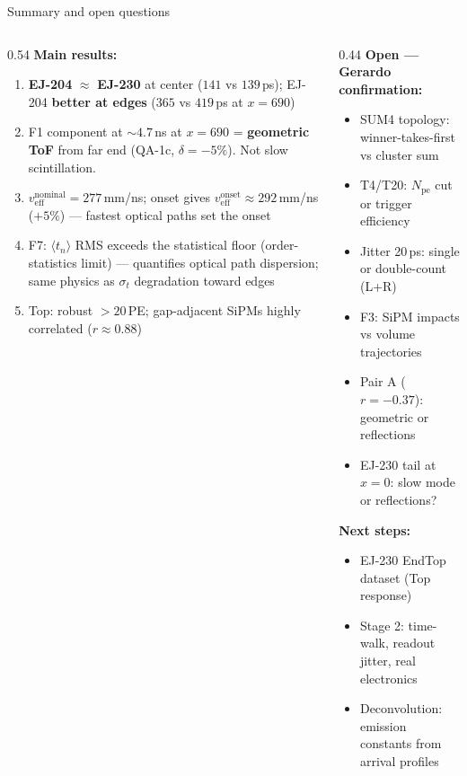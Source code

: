 \documentclass[aspectratio=169,9pt]{beamer}
\begin{document}
\begin{frame}{Summary and open questions}
  \begin{columns}[T]
    \begin{column}{0.54\textwidth}
      \textbf{Main results:}
      \begin{enumerate}
        \item \textcolor{ej204col}{\textbf{EJ-204}} $\approx$
              \textcolor{ej230col}{\textbf{EJ-230}} at center ($141$ vs $139$\,ps);
              EJ-204 \textbf{better at edges} ($365$ vs $419$\,ps at $x=690$)

        \item F1 component at $\sim4.7$\,ns at $x=690$ =
              \textcolor{okgreen}{\textbf{geometric ToF}} from far end
              (QA-1c, $\delta=-5\%$). Not slow scintillation.

        \item $v_\text{eff}^\text{nominal}=277$\,mm/ns;
              onset gives $v_\text{eff}^\text{onset}\approx292$\,mm/ns ($+5\%$)
              — fastest optical paths set the onset

        \item F7: $\langle t_n\rangle$ RMS exceeds the statistical floor
              (order-statistics limit) — quantifies optical path dispersion;
              same physics as $\sigma_t$ degradation toward edges

        \item Top: robust $>20$\,PE; gap-adjacent SiPMs
              highly correlated ($r\approx0.88$)
      \end{enumerate}
    \end{column}
    \begin{column}{0.44\textwidth}
      \textbf{\color{pendgold} Open — Gerardo confirmation:}
      \begin{itemize}
        \item[$\square$] SUM4 topology:
              winner-takes-first vs cluster sum
        \item[$\square$] T4/T20: $N_\text{pe}$ cut or trigger efficiency
        \item[$\square$] Jitter 20\,ps: single or double-count (L+R)
        \item[$\square$] F3: SiPM impacts vs volume trajectories
        \item[$\square$] Pair A ($r=-0.37$):
              geometric or reflections
        \item[$\square$] EJ-230 tail at $x=0$:
              slow mode or reflections?
      \end{itemize}
      \vspace{0.3em}
      \textbf{Next steps:}
      \begin{itemize}
        \item EJ-230 EndTop dataset (Top response)
        \item Stage 2: time-walk, readout jitter, real electronics
        \item Deconvolution: emission constants from arrival profiles
      \end{itemize}
    \end{column}
  \end{columns}
\end{frame}
\end{document}
